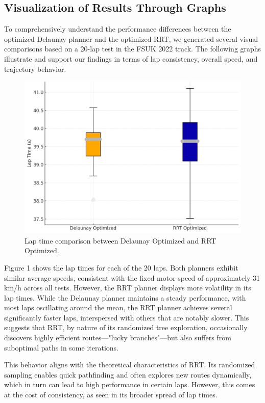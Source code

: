 \documentclass[a4paper,11pt]{report}
\begin{document}
\subsection{Visualization of Results Through Graphs}

To comprehensively understand the performance differences between the optimized Delaunay planner and the optimized RRT, we generated several visual comparisons based on a 20-lap test in the FSUK 2022 track. The following graphs illustrate and support our findings in terms of lap consistency, overall speed, and trajectory behavior.

\begin{figure}[H]
    \centering
    \includegraphics[width=0.95\linewidth]{Images/Laptimecomparaison.png}
    \caption{Lap time comparison between Delaunay Optimized and RRT Optimized.}
\end{figure}

Figure 1 shows the lap times for each of the 20 laps. Both planners exhibit similar average speeds, consistent with the fixed motor speed of approximately 31 km/h across all tests. However, the RRT planner displays more volatility in its lap times. While the Delaunay planner maintains a steady performance, with most laps oscillating around the mean, the RRT planner achieves several significantly faster laps, interspersed with others that are notably slower. This suggests that RRT, by nature of its randomized tree exploration, occasionally discovers highly efficient routes—"lucky branches"—but also suffers from suboptimal paths in some iterations.

This behavior aligns with the theoretical characteristics of RRT. Its randomized sampling enables quick pathfinding and often explores new routes dynamically, which in turn can lead to high performance in certain laps. However, this comes at the cost of consistency, as seen in its broader spread of lap times.
\end{document}
